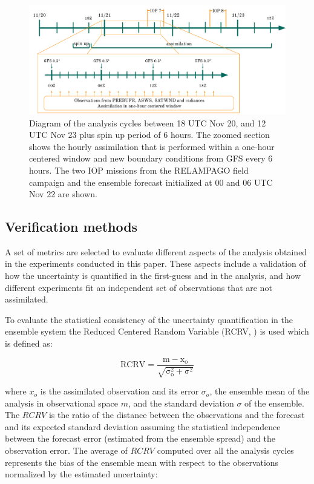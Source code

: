 \documentclass[preprint, 3p, authoryear,review, 12pt]{elsarticle} %
\begin{document}
\begin{figure}
\includegraphics[width=1\linewidth]{../figures/analysis_cycle} \caption{Diagram of the analysis cycles between 18 UTC Nov 20, and 12 UTC Nov 23 plus spin up period of 6 hours. The zoomed section shows the hourly assimilation that is performed within a one-hour centered window and new boundary conditions from GFS every 6 hours. The two IOP missions from the RELAMPAGO field campaign and the ensemble forecast initialized at 00 and 06 UTC Nov 22 are shown.}\label{fig:cycle}
\end{figure}

\hypertarget{verification-methods}{%
\subsection{Verification methods}\label{verification-methods}}

A set of metrics are selected to evaluate different aspects of the analysis obtained in the experiments conducted in this paper. These aspects include a validation of how the uncertainty is quantified in the first-guess and in the analysis, and how different experiments fit an independent set of observations that are not assimilated.

To evaluate the statistical consistency of the uncertainty quantification in the ensemble system the Reduced Centered Random Variable (RCRV, \citet{candille2007}) is used which is defined as:

\begin{equation}
  \mathrm{RCRV = \frac{m - x_o}{\sqrt{\sigma_o^2 + \sigma^2}}}
  \label{eq:eq2}
\end{equation}

where \(x_o\) is the assimilated observation and its error \(\sigma_o\), the ensemble mean of the analysis in observational space \(m\), and the standard deviation \(\sigma\) of the ensemble. The \(RCRV\) is the ratio of the distance between the observations and the forecast and its expected standard deviation assuming the statistical independence between the forecast error (estimated from the ensemble spread) and the observation error. The average of \(RCRV\) computed over all the analysis cycles represents the bias of the ensemble mean with respect to the observations normalized by the estimated uncertainty:
\end{document}

